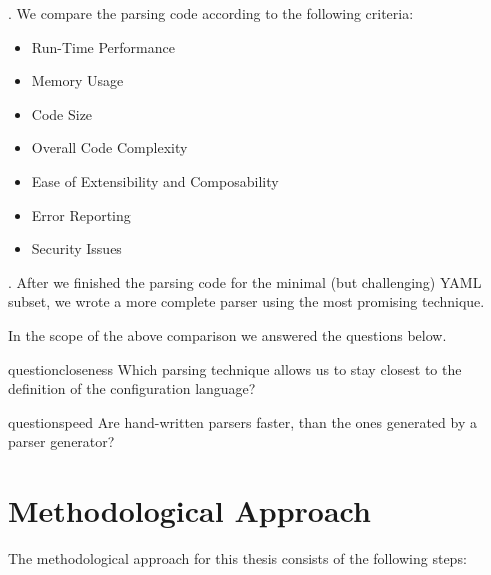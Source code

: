 . We compare the parsing code according to the following criteria:

\begin{itemize}
  \item Run-Time Performance
  \item Memory Usage
  \item Code Size
  \item Overall Code Complexity
  \item Ease of Extensibility and Composability
  \item Error Reporting
  \item Security Issues
\end{itemize}

. After we finished the parsing code for the minimal (but challenging) YAML subset, we wrote a more complete  parser using the most promising technique.

In the scope of the above comparison we answered the questions below.

\begin{restatable}{question}{closeness}
  \label{que:closeness}
  Which parsing technique allows us to stay closest to the definition of the configuration language?
\end{restatable}

\begin{restatable}{question}{speed}
  \label{que:speed}
  Are hand-written parsers faster, than the ones generated by a parser generator?
\end{restatable}

\section{Methodological Approach}

The methodological approach for this thesis consists of the following steps:

